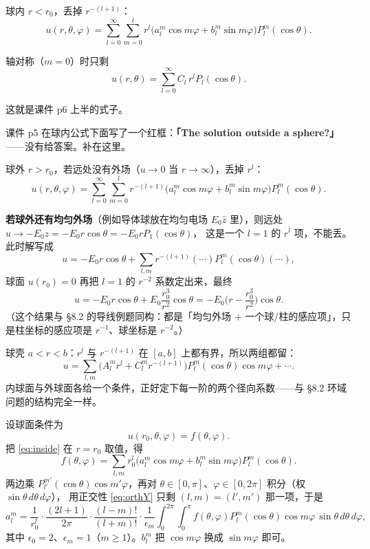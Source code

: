 
球内 $r<r_0$，丢掉 $r^{-(l+1)}$：
\begin{equation}
u(r,\theta,\varphi)=\sum_{l=0}^{\infty}\sum_{m=0}^{l}
r^l\big(a_l^m\cos m\varphi+b_l^m\sin m\varphi\big)P_l^m(\cos\theta) .
\label{eq:inside}
\end{equation}

轴对称（$m=0$）时只剩
\begin{equation}
u(r,\theta)=\sum_{l=0}^{\infty}C_l\,r^lP_l(\cos\theta) .
\label{eq:axisym}
\end{equation}

这就是课件 p6 上半的式子。


课件 p5 在球内公式下面写了一个红框：\textbf{「The solution outside a sphere?」}——没有给答案。补在这里。

球外 $r>r_0$，若远处没有外场（$u\to0$ 当 $r\to\infty$），丢掉 $r^l$：
\begin{equation}
u(r,\theta,\varphi)=\sum_{l=0}^{\infty}\sum_{m=0}^{l}
r^{-(l+1)}\big(a_l^m\cos m\varphi+b_l^m\sin m\varphi\big)P_l^m(\cos\theta) .
\label{eq:outside}
\end{equation}

\textbf{若球外还有均匀外场}（例如导体球放在均匀电场 $E_0\hat z$ 里），则远处 $u\to-E_0z=-E_0r\cos\theta=-E_0rP_1(\cos\theta)$，
这是一个 $l=1$ 的 $r^l$ 项，不能丢。此时解写成
\[
u=-E_0r\cos\theta+\sum_{l,m}r^{-(l+1)}(\cdots)P_l^m(\cos\theta)(\cdots),
\]
球面 $u(r_0)=0$ 再把 $l=1$ 的 $r^{-2}$ 系数定出来，最终
\[
u=-E_0r\cos\theta+E_0\frac{r_0^3}{r^2}\cos\theta
=-E_0\Big(r-\frac{r_0^3}{r^2}\Big)\cos\theta .
\]
（这个结果与 §8.2 的导线例题同构：都是「均匀外场 + 一个球/柱的感应项」，只是柱坐标的感应项是 $r^{-1}$、球坐标是 $r^{-2}$。）


球壳 $a<r<b$：$r^l$ 与 $r^{-(l+1)}$ 在 $[a,b]$ 上都有界，所以两组都留：
\[
u=\sum_{l,m}\big(A_l^mr^l+C_l^mr^{-(l+1)}\big)P_l^m(\cos\theta)\cos m\varphi+\cdots .
\]
内球面与外球面各给一个条件，正好定下每一阶的两个径向系数——与 §8.2 环域问题的结构完全一样。


设球面条件为
\[
u(r_0,\theta,\varphi)=f(\theta,\varphi).
\]
把 \eqref{eq:inside} 在 $r=r_0$ 取值，得
\[
f(\theta,\varphi)=\sum_{l,m}r_0^l\big(a_l^m\cos m\varphi+b_l^m\sin m\varphi\big)P_l^m(\cos\theta).
\]
两边乘 $P_{l'}^{m'}(\cos\theta)\cos m'\varphi$，再对 $\theta\in[0,\pi]$、$\varphi\in[0,2\pi]$ 积分（权 $\sin\theta\,d\theta\,d\varphi$），
用正交性 \eqref{eq:orthY} 只剩 $(l,m)=(l',m')$ 那一项，于是
\begin{equation}
a_l^m=\frac{1}{r_0^l}\cdot\frac{(2l+1)}{2\pi}\cdot\frac{(l-m)!}{(l+m)!}\cdot\frac{1}{\epsilon_m}
\int_0^{2\pi}\!\!\int_0^{\pi}f(\theta,\varphi)P_l^m(\cos\theta)\cos m\varphi\,\sin\theta\,d\theta\,d\varphi ,
\label{eq:coef}
\end{equation}
其中 $\epsilon_0=2$、$\epsilon_m=1$（$m\ge1$）。$b_l^m$ 把 $\cos m\varphi$ 换成 $\sin m\varphi$ 即可。


